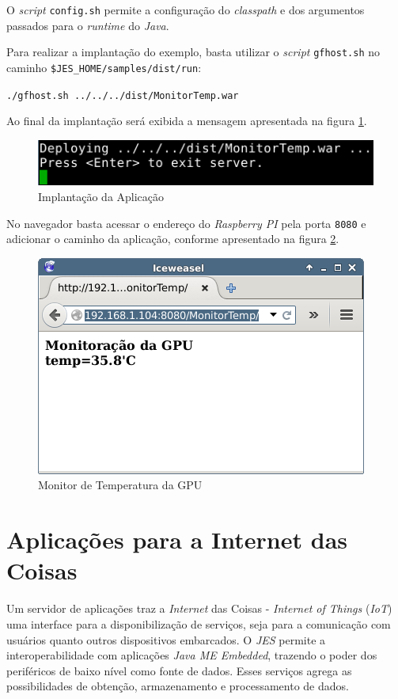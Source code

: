 O \textit{script} \verb|config.sh| permite a configuração do \textit{classpath}
e dos argumentos passados para o \textit{runtime} do \textit{Java}.

Para realizar a implantação do exemplo, basta utilizar o \textit{script}
\verb|gfhost.sh| no caminho \verb|$JES_HOME/samples/dist/run|:

\verb|./gfhost.sh ../../../dist/MonitorTemp.war|

Ao final da implantação será exibida a mensagem apresentada na figura
\ref{fig:java-me/java-jes-deploy}.

\begin{figure}[H]
    \centering
    \includegraphics[width=0.7\linewidth]{figuras/java/java-jes-deploy.png}
    \caption{Implantação da Aplicação}
    \label{fig:java-me/java-jes-deploy}
\end{figure}

No navegador basta acessar o endereço do \textit{Raspberry PI} pela porta
\verb|8080| e adicionar o caminho da aplicação, conforme apresentado na figura
\ref{fig:java-me/java-jes-browser}.

\begin{figure}[H]
    \centering
    \includegraphics[width=0.7\linewidth]{figuras/java/java-jes-browser.png}
    \caption{Monitor de Temperatura da GPU}
    \label{fig:java-me/java-jes-browser}
\end{figure}

\section{Aplicações para a Internet das Coisas}

Um servidor de aplicações traz a \textit{Internet} das Coisas -
\textit{Internet of Things} (\textit{IoT}) uma interface para a
disponibilização de serviços, seja para a comunicação com usuários quanto
outros dispositivos embarcados. O \textit{JES} permite a interoperabilidade com
aplicações \textit{Java ME Embedded}, trazendo o poder dos periféricos de baixo
nível como fonte de dados. Esses serviços agrega as possibilidades de obtenção,
armazenamento e processamento de dados.

